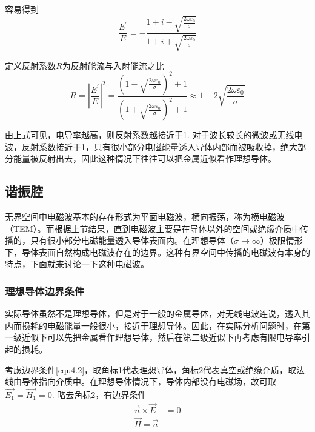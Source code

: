 \documentclass[UTF8]{ctexart}
\begin{document}
\noindent 容易得到
\begin{equation}
    \frac{E^{\prime}}{E}=-\frac{1+i-\sqrt{\frac{2 \omega \varepsilon_{0}}{\sigma}}}{1+i+\sqrt{\frac{2 \omega \varepsilon_{0}}{\sigma}}}
    \end{equation}

\noindent 定义反射系数$R$为反射能流与入射能流之比
\begin{equation}
    R=\left|\frac{E^{\prime}}{E}\right|^{2}=\frac{(1-\sqrt{\frac{2 \omega \varepsilon_{0}}{\sigma}})^{2}+1}{(1+\sqrt{\frac{2 \omega \varepsilon_{0}}{\sigma}})^{2}+1} \approx 1-2 \sqrt{\frac{2 \omega \varepsilon_{0}}{\sigma}}
    \end{equation}

\noindent 由上式可见，电导率越高，则反射系数越接近于1. 对于波长较长的微波或无线电波，反射系数接近于1，只有很小部分电磁能量透入导体内部而被吸收掉，绝大部分能量被反射出去，因此这种情况下往往可以把金属近似看作理想导体。

    \subsection{谐振腔}
    无界空间中电磁波基本的存在形式为平面电磁波，横向振荡，称为横电磁波（TEM）。而根据上节结果，直到电磁波主要是在导体以外的空间或绝缘介质中传播的，只有很小部分电磁能量透入导体表面内。在理想导体（$\sigma \to \infty$）极限情形下，导体表面自然构成电磁波存在的边界。这种有界空间中传播的电磁波有本身的特点，下面就来讨论一下这种电磁波。

    \subsubsection{理想导体边界条件}
    实际导体虽然不是理想导体，但是对于一般的金属导体，对无线电波连说，透入其内而损耗的电磁能量一般很小，接近于理想导体。因此，在实际分析问题时，在第一级近似下可以先把金属看作理想导体，然后在第二级近似下再考虑有限电导率引起的损耗。

    考虑边界条件\autoref{equ4.2}，取角标1代表理想导体，角标2代表真空或绝缘介质，取法线由导体指向介质中。在理想导体情况下，导体内部没有电磁场，故可取$\vec{E_1} = \vec{H_1} =0$. 略去角标2，有边界条件
    \begin{equation}
        \begin{aligned}
            \vec{n} \times \vec{E} &=0 \\
            \vec{H} = \vec{a}
        \end{aligned}
    \end{equation}
\end{document}

